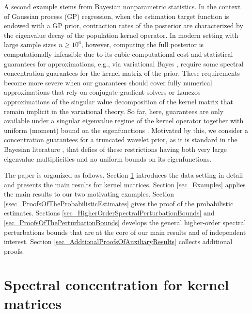 \documentclass[a4paper,11pt]{article} %
\numberwithin{equation}{section}
\theoremstyle{definition}
\theoremstyle{remark}
\theoremstyle{plain}
\begin{document}
A second example stems from Bayesian nonparametric statistics.
In the context of Gaussian process (GP) regression, when the estimation target function is endowed with a GP prior, contraction rates of the posterior are characterized by the eigenvalue decay of the population kernel operator.
In modern setting with large sample sizes \( n \ge 10^6 \), however, computing the full posterior is computationally infeasible due to its cubic computational cost and statistical guarantees for approximations, e.g., via variational Bayes \cite{NiemanEtal2022ContractionRates, Nieman2023UncertaintyQuantification, NiemanSzabo2025AdaptiveVB}, require some spectral concentration guarantees for the kernel matrix of the prior.
These requirements become more severe when our guarantees should cover fully numerical approximations \cite{WangEtal2019ExactGPs, WengerEtal2022ComputationalUncertainty, GardnerEtal2018GPyTorch} that rely on conjugate-gradient solvers or Lanczos approximations of the singular value decomposition of the kernel matrix that remain implicit in the variational theory.
So far, here, guarantees are only available under a singular eigenvalue regime of the kernel operator together with uniform (moment) bound on the eigenfunctions \cite{StankewitzSzabo24}.
Motivated by this, we consider a concentration guarantees for a truncated wavelet prior, as it is standard in the Bayesian literature \cite{GhosalvdVaart2017FundamentalsOfBayes}, that defies of these restrictions having both very large eigenvalue multiplicities and no uniform bounds on its eigenfunctions.

The paper is organized as follows.
Section \ref{sec_SpectralConcentrationForKernelMatrices} introduces the data setting in detail and presents the main results for kernel matrices.
Section \ref{sec_Examples} applies the main results to our two motivating examples.
Section \ref{ssec_ProofsOfTheProbabilisticEstimates} gives the proof of the probabilistic estimates.
Sections \ref{sec_HigherOrderSpectralPerturbationBounds} and \ref{sec_ProofsOfThePerturbationBounds} develops the general higher-order spectral perturbations bounds that are at the core of our main results and of independent interest.
Section \ref{sec_AddtionalProofsOfAuxiliaryResults} collects additional proofs.


\section{Spectral concentration for kernel matrices}%
\label{sec_SpectralConcentrationForKernelMatrices}
\end{document}
